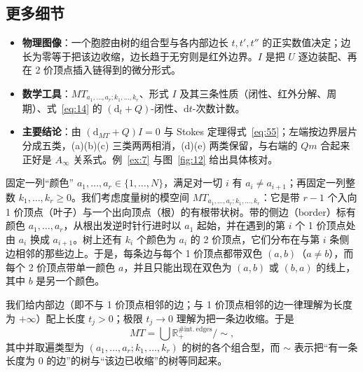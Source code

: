 \subsection{更多细节}\label{sec:4.2}

\begin{takeaway}
\begin{itemize}
  \item \textbf{物理图像}：一个胞腔由树的组合型与各内部边长 $t,t',t''$ 的正实数值决定；边长为零等于把该边收缩，边长趋于无穷则是红外边界。$I$ 是把 $U$ 逐边装配、再在 2 价顶点插入链得到的微分形式。
  \item \textbf{数学工具}：$MT_{a_1,\dots,a_r;k_1,\dots,k_r}$、形式 $I$ 及其三条性质（闭性、红外分解、周期）、式~\eqref{eq:14} 的 $(\mathrm{d}_t+Q)$-闭性、$\mathrm{d}t$-次数计数。
  \item \textbf{主要结论}：由 $(\mathrm{d}_{MT}+Q)I=0$ 与 Stokes 定理得式~\eqref{eq:55}；左端按边界层片分成五类，(a)(b)(c) 三类两两相消，(d)(e) 两类保留，与右端的 $Qm$ 合起来正好是 $A_\infty$ 关系式。例~\ref{ex:7} 与图~\ref{fig:12} 给出具体核对。
\end{itemize}
\end{takeaway}

固定一列“颜色” $a_1,\dots,a_r\in\{1,\dots,N\}$，满足对一切 $i$ 有 $a_i\neq a_{i+1}$；再固定一列整数 $k_1,\dots,k_r\ge0$。我们考虑度量树的模空间 $MT_{a_1,\dots,a_r;k_1,\dots,k_r}$：它是带 $r-1$ 个入向 1 价顶点（叶子）与一个出向顶点（根）的有根带状树。带的侧边（border）标有颜色 $a_1,\dots,a_r$，从根出发逆时针行进时以 $a_1$ 起始，并在遇到的第 $i$ 个 1 价顶点处由 $a_i$ 换成 $a_{i+1}$。树上还有 $k_i$ 个颜色为 $a_i$ 的 2 价顶点，它们分布在与第 $i$ 条侧边相邻的那些边上。于是，每条边与每个 1 价顶点都带双色 $(a,b)$（$a\neq b$），而每个 2 价顶点带单一颜色 $a$，并且只能出现在双色为 $(a,b)$ 或 $(b,a)$ 的线上，其中 $b$ 是另一个颜色。

我们给内部边（即不与 1 价顶点相邻的边；与 1 价顶点相邻的边一律理解为长度为 $+\infty$）配上长度 $t_j>0$；极限 $t_j\to0$ 理解为把一条边收缩。于是
\[
  MT=\bigcup \mathbb R_+^{\#\mathrm{int.}\ \mathrm{edges}}/\sim,
\]
其中并取遍类型为 $(a_1,\dots,a_r;k_1,\dots,k_r)$ 的树的各个组合型，而 $\sim$ 表示把“有一条长度为 0 的边”的树与“该边已收缩”的树等同起来。


